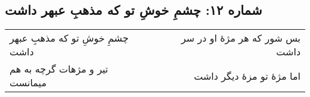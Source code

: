 \begin{center}
\section*{شماره ۱۲: چشمِ خوشِ تو که مذهبِ عبهر داشت}
\label{sec:012}
\begin{longtable}{l p{0.5cm} r}
چشمِ خوشِ تو که مذهبِ عبهر داشت
&&
بس شور که هر مژهٔ او در سر داشت
\\
تیر و مژهات گرچه به هم میمانست
&&
اما مژهٔ تو مزهٔ دیگر داشت
\\
\end{longtable}
\end{center}
